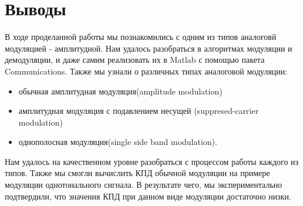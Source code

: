 \section{Выводы}
В ходе проделанной работы мы познакомились с одним из типов аналоговй модуляцией - амплитудной.
Нам удалось разобраться в алгоритмах модуляции и демодуляции, и даже самим реализовать их в Matlab с помощью пакета Communications. Также мы узнали о различных типах аналоговой модуляции:
\begin{itemize}
	\item обычная амплитудная модуляция(amplitude modulation)
	\item амплитудная модуляция с подавлением несущей (suppresed-carrier modulation)
	\item однополосная модуляция(single side band modulation).
\end{itemize}
Нам удалось на качественном уровне разобраться с процессом работы каждого из типов.
Также мы смогли вычислить КПД обычной модуляции на примере модуляции однотонального сигнала.
В результате чего, мы экспериментально подтвердили, что значения КПД при данном виде модуляции достаточно низки. 


